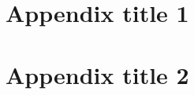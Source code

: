 \documentclass[final,5p,times,twocolumn]{elsarticle}
\begin{document}
\appendix

\section{Appendix title 1}

\section{Appendix title 2}

 







\end{document}
